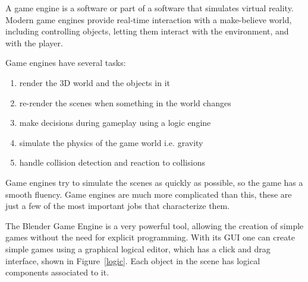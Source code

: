 A game engine is a software or part of a software that simulates virtual reality\cite{bookGameKit2}. Modern game engines provide real-time interaction with a make-believe world, including controlling objects, letting them interact with the environment, and with the player. 

Game engines have several tasks:
\begin{enumerate}
\item{render the 3D world and the objects in it}
\item{re-render the scenes when something in the world changes}
\item{make decisions during gameplay using a logic engine}
\item{simulate the physics of the game world i.e. gravity}
\item{handle collision detection and reaction to collisions}
\end{enumerate}

Game engines try to simulate the scenes as quickly as possible, so the game has a smooth fluency. Game engines are much more complicated than this, these are just a few of the most important jobs that characterize them.

The Blender Game Engine is a very powerful tool, allowing the creation of simple games without  the need for explicit programming. With its GUI one can create simple games using a graphical logical editor, which has a click and drag interface, shown in Figure~\ref{logic}. Each object in the scene has logical components associated to it. 

